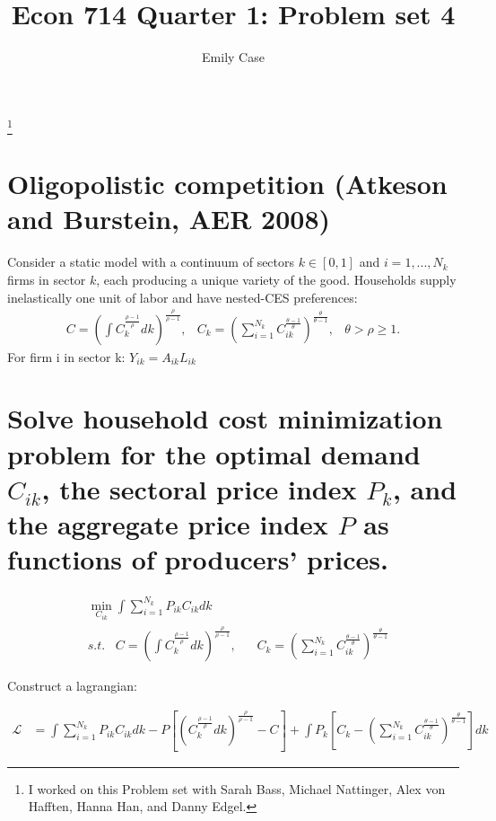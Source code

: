 \documentclass[12pt,oneside,reqno]{amsart}
\title{Econ 714 Quarter 1: Problem set 4 }
\author{Emily Case}
\newcommand\blfootnote[1]{%
	\begingroup
	\renewcommand\thefootnote{}\footnote{#1}%
	\addtocounter{footnote}{-1}%
	\endgroup
}
\newcommand{\lag}{\mathcal{L}}
\begin{document}
	
	\maketitle
	
	\blfootnote{I worked on this Problem set with Sarah Bass, Michael Nattinger, Alex von Hafften, Hanna Han, and Danny Edgel.} 



\newcommand{\sumi}{\sum_{i=1}^{N_k}}
\newcommand{\ik}{_{ik}}

\section*{Oligopolistic competition (Atkeson and Burstein, AER 2008)}
Consider a static model with a continuum of sectors $k\in[0,1]$ and $i= 1,...,N_k$ firms in sector $k$, each producing a unique variety of the good.  Households supply inelastically one unit of labor and have nested-CES preferences:
\begin{align*}
& C = \left( \int C_k^{\frac{\rho-1}{\rho}}dk\right)^{\frac{\rho}{\rho-1}},
& C_k = \left( \sum_{i=1}^{N_k} C_{ik}^{\frac{\theta-1}{\theta}}\right)^{\frac{\theta}{\theta-1}},
& \theta > \rho \ge 1.&
\end{align*}
For firm i in sector k: $ Y_{ik}= A_{ik}L_{ik}$ 



\section{Solve household cost minimization problem for the optimal demand $C_{ik}$, the sectoral price index $P_k$, and the aggregate price index $P$ as functions of producers’ prices.}
\begin{align*}
& \min_{C_{ik}} \int \sumi P\ik C\ik dk \\
& s.t.\;\;\; 
C = \left( \int C_k^{\frac{\rho-1}{\rho}}dk\right)^{\frac{\rho}{\rho-1}},\;\;\; 
& C_k = \left( \sum_{i=1}^{N_k} C_{ik}^{\frac{\theta-1}{\theta}}\right)^{\frac{\theta}{\theta-1}}
\end{align*}

Construct a lagrangian:

\begin{align*}
\lag & = \int \sumi P\ik C\ik dk 
         - P \left[\left( C_k^{\frac{\rho-1}{\rho}} dk
         \right)
         ^{\frac{\rho}{\rho-1}} - C \right]
         + \int P_k \left[C_k - \left(\sumi C\ik 
         ^{\frac{\theta-1}{\theta}}
         \right)^{\frac{\theta
         }{\theta-1}}\right] dk
\end{align*}
\end{document}
